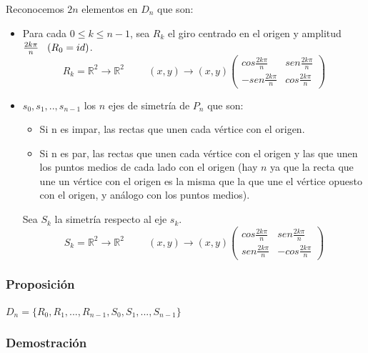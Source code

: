 \documentclass[11pt,a4paper]{article}
\begin{document}
Reconocemos $2n$ elementos en $D_{n}$ que son:
\begin{itemize}
\item Para cada $0 \leq k \leq n-1$, sea $R_{k}$ el giro centrado en el origen y amplitud $\frac{2k\pi}{n} \hspace{0.3cm} (R_{0} = id)$.
\begin{equation*}
R_{k} = \mathbb{R}^{2} \to \mathbb{R}^{2} \hspace{1cm} (x,y) \to (x,y)
\begin{pmatrix}
cos\frac{2k\pi}{n} & sen\frac{2k\pi}{n} \\
-sen\frac{2k\pi}{n} & cos\frac{2k\pi}{n}
\end{pmatrix}
\end{equation*}
\item $s_{0}, s_{1}, .., s_{n-1}$ los $n$ ejes de simetría de $P_{n}$ que son:
\begin{itemize}
\item Si n es impar, las rectas que unen cada vértice con el origen.
\item Si n es par, las rectas que unen cada vértice con el origen y las que unen los puntos medios de cada lado con el origen (hay $n$ ya que la recta que une un vértice con el origen es la misma que la que une el vértice opuesto con el origen, y análogo con los puntos medios).
\end{itemize}
Sea $S_{k}$ la simetría respecto al eje $s_{k}$.
\begin{equation*}
S_{k} = \mathbb{R}^{2} \to \mathbb{R}^{2} \hspace{1cm} (x,y) \to (x,y)
\begin{pmatrix}
cos\frac{2k\pi}{n} & sen\frac{2k\pi}{n} \\
sen\frac{2k\pi}{n} & -cos\frac{2k\pi}{n}
\end{pmatrix}
\end{equation*}
\end{itemize}


\subsubsection*{Proposición}

$D_{n} = \{R_{0}, R_{1}, ..., R_{n-1}, S_{0}, S_{1}, ..., S_{n-1}\}$

\subsubsection*{Demostración}
\end{document}
